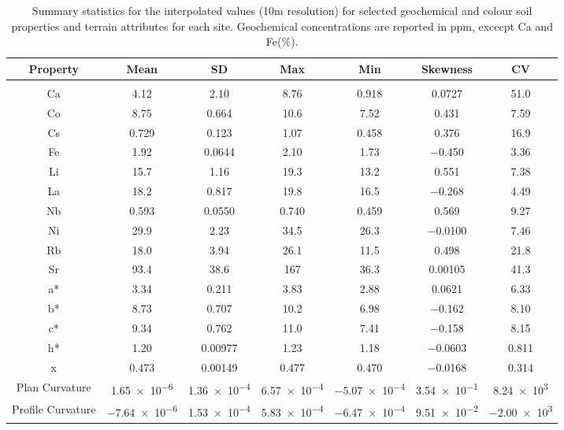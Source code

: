 \documentclass[
  number]{elsarticle}
\begin{document}
\begin{longtable}[]{@{}ccccccc@{}}

\caption{\label{tbl-univariate2-summary}Summary statistics for the
interpolated values (10m resolution) for selected geochemical and colour
soil properties and terrain attributes for each site. Geochemical
concentrations are reported in ppm, excecpt Ca and Fe(\%).}

\tabularnewline

\toprule\noalign{}
Property & Mean & SD & Max & Min & Skewness & CV \\
\midrule\noalign{}
\endhead
\bottomrule\noalign{}
\endlastfoot
\multicolumn{7}{@{}c@{}}{%
Agriculture} \\
Ca & 4.12 & 2.10 & 8.76 & 0.918 & 0.0727 & 51.0 \\
Co & 8.75 & 0.664 & 10.6 & 7.52 & 0.431 & 7.59 \\
Cs & 0.729 & 0.123 & 1.07 & 0.458 & 0.376 & 16.9 \\
Fe & 1.92 & 0.0644 & 2.10 & 1.73 & −0.450 & 3.36 \\
Li & 15.7 & 1.16 & 19.3 & 13.2 & 0.551 & 7.38 \\
La & 18.2 & 0.817 & 19.8 & 16.5 & −0.268 & 4.49 \\
Nb & 0.593 & 0.0550 & 0.740 & 0.459 & 0.569 & 9.27 \\
Ni & 29.9 & 2.23 & 34.5 & 26.3 & −0.0100 & 7.46 \\
Rb & 18.0 & 3.94 & 26.1 & 11.5 & 0.498 & 21.8 \\
Sr & 93.4 & 38.6 & 167 & 36.3 & 0.00105 & 41.3 \\
a* & 3.34 & 0.211 & 3.83 & 2.88 & 0.0621 & 6.33 \\
b* & 8.73 & 0.707 & 10.2 & 6.98 & −0.162 & 8.10 \\
c* & 9.34 & 0.762 & 11.0 & 7.41 & −0.158 & 8.15 \\
h* & 1.20 & 0.00977 & 1.23 & 1.18 & −0.0603 & 0.811 \\
x & 0.473 & 0.00149 & 0.477 & 0.470 & −0.0168 & 0.314 \\
Plan Curvature & 1.65~×~10\textsuperscript{−6} &
1.36~×~10\textsuperscript{−4} & 6.57~×~10\textsuperscript{−4} &
−5.07~×~10\textsuperscript{−4} & 3.54~×~10\textsuperscript{−1} &
8.24~×~10\textsuperscript{3} \\
Profile Curvature & −7.64~×~10\textsuperscript{−6} &
1.53~×~10\textsuperscript{−4} & 5.83~×~10\textsuperscript{−4} &
−6.47~×~10\textsuperscript{−4} & 9.51~×~10\textsuperscript{−2} &
−2.00~×~10\textsuperscript{3} \\

\end{longtable}
\end{document}
